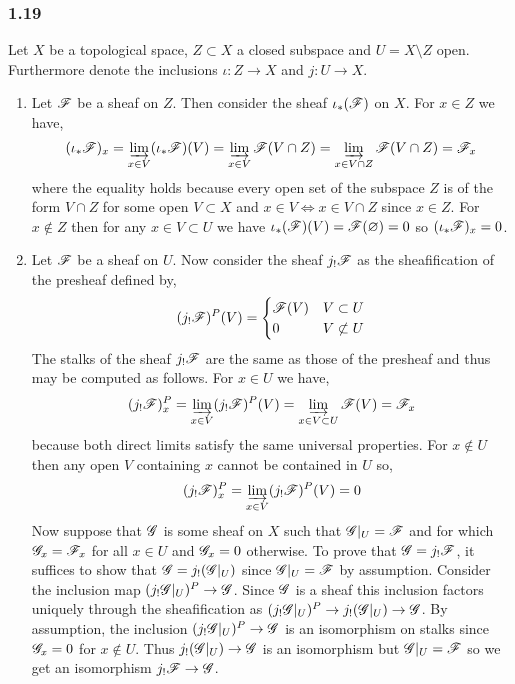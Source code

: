 \documentclass[12pt]{article}
\begin{document}
\subsubsection{1.19}

Let $X$ be a topological space, $Z \subset X$ a closed subspace and $U = X \setminus Z$ open. Furthermore denote the inclusions $\iota : Z \to X$ and $j : U \to X$. 

\begin{enumerate}
\item Let $\mathscr{F}$ be a sheaf on $Z$. Then consider the sheaf $\iota_*(\mathscr{F})$ on $X$. For $x \in Z$ we have, 
\[ (\iota_* \mathscr{F})_x = \varinjlim_{x \in V} (\iota_* \mathscr{F})(V) = \varinjlim_{x \in V} \mathscr{F}(V \cap Z) = \varinjlim_{x \in V \cap Z} \mathscr{F}(V \cap Z) = \mathscr{F}_x \]
where the equality holds because every open set of the subspace $Z$ is of the form $V \cap Z$  for some open $V \subset X$ and $x \in V \iff x \in V \cap Z$ since $x \in Z$.
For $x \notin Z$ then for any $x \in V \subset U$ we have $\iota_*(\mathscr{F})(V) = \mathscr{F}(\varnothing) = 0$ so $(\iota_* \mathscr{F})_x = 0$. 

\item Let $\mathscr{F}$ be a sheaf on $U$. Now consider the sheaf $j_! \mathscr{F}$ as the sheafification of the presheaf defined by,
\[ (j_! \mathscr{F})^P(V) = \begin{cases}
\mathscr{F}(V) & V \subset U 
\\
0 & V \not\subset U
\end{cases} \]
The stalks of the sheaf $j_! \mathscr{F}$ are the same as those of the presheaf and thus may be computed as follows.
For $x \in U$ we have,
\[ (j_! \mathscr{F})^P_x = \varinjlim_{x \in V} (j_! \mathscr{F})^P(V) = \varinjlim_{x \in V \subset U} \mathscr{F}(V) = \mathscr{F}_x \]
because both direct limits satisfy the same universal properties. For $x \notin U$ then any open $V$ containing $x$ cannot be contained in $U$ so,
\[ (j_! \mathscr{F})^P_x = \varinjlim_{x \in V} (j_! \mathscr{F})^P(V) = 0 \]
Now suppose that $\mathscr{G}$ is some sheaf on $X$ such that $\mathscr{G}|_U = \mathscr{F}$ and for which $\mathscr{G}_x = \mathscr{F}_x$ for all $x \in U$ and $\mathscr{G}_x = 0$ otherwise. To prove that $\mathscr{G} = j_! \mathscr{F}$, it suffices to show that $\mathscr{G} = j_! (\mathscr{G}|_U)$ since $\mathscr{G}|_U = \mathscr{F}$ by assumption. Consider the inclusion map $(j_! \mathscr{G}|_U)^P \to \mathscr{G}$. Since $\mathscr{G}$ is a sheaf this inclusion factors uniquely through the sheafification as $(j_! \mathscr{G} |_U)^P \to j_! (\mathscr{G}|_U) \to \mathscr{G}$. By assumption, the inclusion $(j_! \mathscr{G}|_U)^P \to \mathscr{G}$ is an isomorphism on stalks since $\mathscr{G}_x = 0$ for $x \notin U$. Thus $j_! (\mathscr{G}|_U) \to \mathscr{G}$ is an isomorphism but $\mathscr{G}|_U = \mathscr{F}$ so we get an isomorphism $j_! \mathscr{F} \to \mathscr{G}$. 



\end{enumerate}
\end{document}
